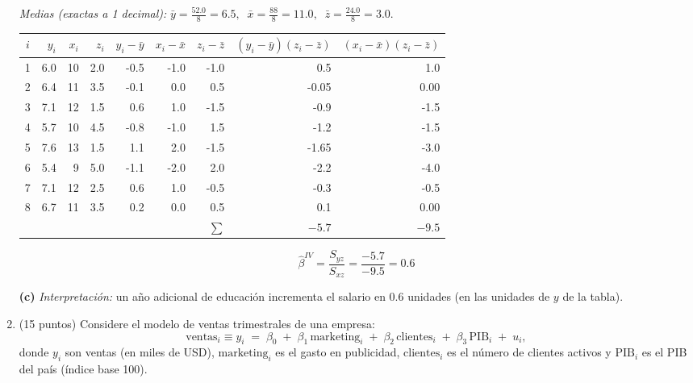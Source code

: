 \documentclass[10pt,a4paper]{article}
\begin{document}
\begin{enumerate}
\textit{Medias (exactas a 1 decimal):}\quad
\(\displaystyle \bar y=\frac{52.0}{8}=6.5,\;\; \bar x=\frac{88}{8}=11.0,\;\; \bar z=\frac{24.0}{8}=3.0.\)

\begin{center}
\small
\begin{tabular}{|c|r|r|r|r|r|r|r|r|}
\hline
\(i\) & \(y_i\) & \(x_i\) & \(z_i\) & \(y_i-\bar y\) & \(x_i-\bar x\) & \(z_i-\bar z\) & \((y_i-\bar y)(z_i-\bar z)\) & \((x_i-\bar x)(z_i-\bar z)\) \\
\hline
1 & 6.0 & 10 & 2.0 & -0.5 & -1.0 & -1.0 & \phantom{-}0.5 & \phantom{-}1.0 \\
2 & 6.4 & 11 & 3.5 & -0.1 & \phantom{-}0.0 & \phantom{-}0.5 & -0.05 & \phantom{-}0.00 \\
3 & 7.1 & 12 & 1.5 & \phantom{-}0.6 & \phantom{-}1.0 & -1.5 & -0.9 & -1.5 \\
4 & 5.7 & 10 & 4.5 & -0.8 & -1.0 & \phantom{-}1.5 & -1.2 & -1.5 \\
5 & 7.6 & 13 & 1.5 & \phantom{-}1.1 & \phantom{-}2.0 & -1.5 & -1.65 & -3.0 \\
6 & 5.4 &  9 & 5.0 & -1.1 & -2.0 & \phantom{-}2.0 & -2.2 & -4.0 \\
7 & 7.1 & 12 & 2.5 & \phantom{-}0.6 & \phantom{-}1.0 & -0.5 & -0.3 & -0.5 \\
8 & 6.7 & 11 & 3.5 & \phantom{-}0.2 & \phantom{-}0.0 & \phantom{-}0.5 & \phantom{-}0.1 & \phantom{-}0.00 \\
\hline
\multicolumn{7}{|r|}{\(\sum\)} & \(-5.7\) & \(-9.5\) \\
\hline
\end{tabular}
\end{center}

\[
\boxed{\;\hat\beta^{IV}=\frac{S_{yz}}{S_{xz}}=\frac{-5.7}{-9.5}=0.6\;}
\]

\medskip
\textbf{(c)} \textit{Interpretación:} un año adicional de educación incrementa el salario en \(0.6\) unidades (en las unidades de \(y\) de la tabla).





      \color{black}  
    \item (15 puntos) Considere el modelo de ventas trimestrales de una empresa:
\[
\text{ventas}_i \equiv y_i \;=\; \beta_0 \;+\; \beta_1\,\text{marketing}_i \;+\; \beta_2\,\text{clientes}_i \;+\; \beta_3\,\text{PIB}_i \;+\; u_i,
\]
donde \(y_i\) son ventas (en miles de USD), \(\text{marketing}_i\) es el gasto en publicidad,
\(\text{clientes}_i\) es el número de clientes activos y \(\text{PIB}_i\) es el PIB del país (índice base 100).


\end{enumerate}
\end{document}
